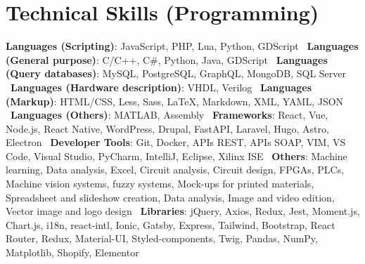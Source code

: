 \documentclass[letterpaper,11pt]{article}
\begin{document}
\section{Technical Skills (Programming)}
\begin{itemize}[leftmargin=0.15in, label={}]
  \small{\item{
    \textbf{Languages (Scripting)}{: JavaScript, PHP, Lua, Python, GDScript} \
    \textbf{Languages (General purpose)}{: C/C++, C#, Python, Java, GDScript} \
    \textbf{Languages (Query databases)}{: MySQL, PostgreSQL, GraphQL, MongoDB, SQL Server} \
    \textbf{Languages (Hardware description)}{: VHDL, Verilog} \
    \textbf{Languages (Markup)}{: HTML/CSS, Less, Sass, LaTeX, Markdown, XML, YAML, JSON} \
    \textbf{Languages (Others)}{: MATLAB, Assembly} \
    \textbf{Frameworks}{: React, Vue, Node.js, React Native, WordPress, Drupal, FastAPI, Laravel, Hugo, Astro, Electron} \
    \textbf{Developer Tools}{: Git, Docker, APIs REST, APIs SOAP, VIM, VS Code, Visual Studio, PyCharm, IntelliJ, Eclipse, Xilinx ISE} \
    \textbf{Others}{: Machine learning, Data analysis, Excel, Circuit analysis, Circuit design, FPGAs, PLCs, Machine vision systems, fuzzy systems, Mock-ups for printed materials, Spreadsheet and slideshow creation, Data analysis, Image and video edition, Vector image and logo design} \
    \textbf{Libraries}{: jQuery, Axios, Redux, Jest, Moment.js, Chart.js, i18n, react-intl, Ionic, Gatsby, Express, Tailwind, Bootstrap, React Router, Redux, Material-UI, Styled-components, Twig, Pandas, NumPy, Matplotlib, Shopify, Elementor}
  }}
\end{itemize}

\end{document}
